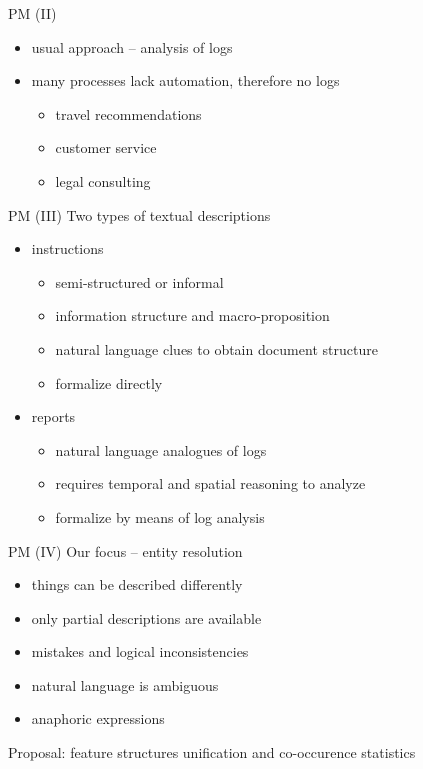 \documentclass{beamer}
\begin{document}
\begin{frame}{PM (II)}
\begin{itemize}
    \item usual approach -- analysis of logs
    \item many processes lack automation, therefore no logs
        \begin{itemize}
            \item travel recommendations
            \item customer service
            \item legal consulting
        \end{itemize}
\end{itemize}
\end{frame}

\begin{frame}{PM (III)}
Two types of textual descriptions\\
\bigskip
\begin{itemize}
    \item instructions
        \begin{itemize}
            \item semi-structured or informal
            \item information structure and macro-proposition
            \item natural language clues to obtain document structure
            \item formalize directly
        \end{itemize}
    \item reports
        \begin{itemize}
            \item natural language analogues of logs
            \item requires temporal and spatial reasoning to analyze
            \item formalize by means of log analysis
        \end{itemize}
\end{itemize}
\end{frame}

\begin{frame}{PM (IV)}
Our focus -- entity resolution\\
\bigskip
\begin{itemize}
    \item things can be described differently
    \item only partial descriptions are available
    \item mistakes and logical inconsistencies
    \item natural language is ambiguous
    \item anaphoric expressions
\end{itemize}
\bigskip
Proposal: feature structures unification and co-occurence statistics
\end{frame}
\end{document}

